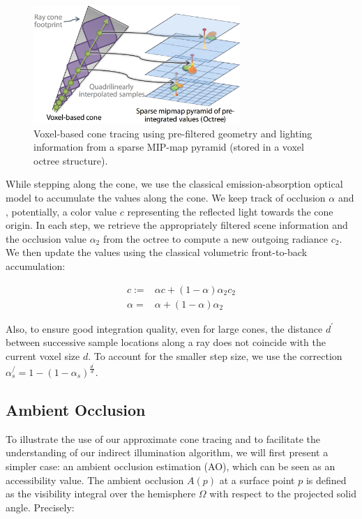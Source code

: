 \begin{figure}\label{f:vct-approximate-voxel-cone-tracing}
	\begin{center}
		\includegraphics[width=0.7\textwidth]{graphics/vct/vct-7-4}
	\end{center}
	\caption{Voxel-based cone tracing using pre-filtered geometry and lighting information from a sparse MIP-map pyramid (stored in a voxel octree structure).}
\end{figure} 

While stepping along the cone, we use the classical emission-absorption optical model to accumulate the values along the cone. We keep track of occlusion $\alpha$ and , potentially, a color value $c$ representing the reflected light towards the cone origin. In each step, we retrieve the appropriately filtered scene information and the occlusion value $\alpha_2$ from the octree to compute a new outgoing radiance $c_2$. We then update the values using the classical volumetric front-to-back accumulation: 

\begin{equation*}
	\begin{aligned}
		c:=&\alpha c+(1-\alpha)\alpha_2c_2\\
		\alpha=&\alpha+(1-\alpha)\alpha_2
	\end{aligned}
\end{equation*}

Also, to ensure good integration quality, even for large cones, the distance $d^{'}$ between successive sample locations along a ray does not coincide with the current voxel size $d$. To account for the smaller step size, we use the correction $\alpha^{/}_s=1-(1-\alpha_s)^{\frac{d^{'}}{d}}$. 





\subsection{Ambient Occlusion}
To illustrate the use of our approximate cone tracing and to facilitate the understanding of our indirect illumination algorithm, we will first present a simpler case: an ambient occlusion estimation (AO), which can be seen as an accessibility value. The ambient occlusion $A(p)$ at a surface point $p$ is defined as the visibility integral over the hemisphere $\Omega$ with respect to the projected solid angle. Precisely:

